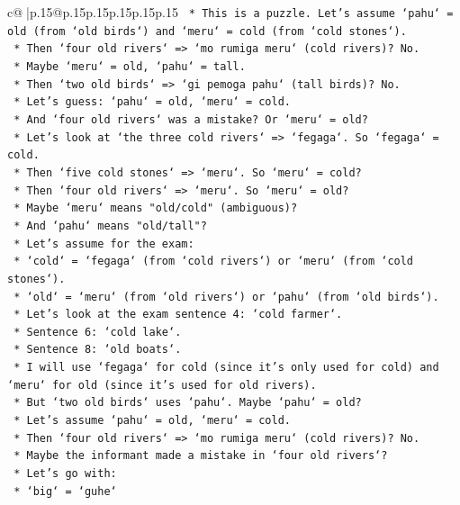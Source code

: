 \documentclass{article}
\begin{document}
{\begin{supertabular}{c@{$\;$}|p{.15\linewidth}@{}p{.15\linewidth}p{.15\linewidth}p{.15\linewidth}p{.15\linewidth}p{.15\linewidth}}
{{{\texttt{    *   This is a puzzle. Let's assume `pahu` = old (from `old birds`) and `meru` = cold (from `cold stones`).} \\
\texttt{    *   Then `four old rivers` => `mo rumiga meru` (cold rivers)? No.} \\
\texttt{    *   Maybe `meru` = old, `pahu` = tall.} \\
\texttt{    *   Then `two old birds` => `gi pemoga pahu` (tall birds)? No.} \\
\texttt{    *   Let's guess: `pahu` = old, `meru` = cold.} \\
\texttt{    *   And `four old rivers` was a mistake? Or `meru` = old?} \\
\texttt{    *   Let's look at `the three cold rivers` => `fegaga`. So `fegaga` = cold.} \\
\texttt{    *   Then `five cold stones` => `meru`. So `meru` = cold?} \\
\texttt{    *   Then `four old rivers` => `meru`. So `meru` = old?} \\
\texttt{    *   Maybe `meru` means "old/cold" (ambiguous)?} \\
\texttt{    *   And `pahu` means "old/tall"?} \\
\texttt{    *   Let's assume for the exam:} \\
\texttt{        *   `cold` = `fegaga` (from `cold rivers`) or `meru` (from `cold stones`).} \\
\texttt{        *   `old` = `meru` (from `old rivers`) or `pahu` (from `old birds`).} \\
\texttt{    *   Let's look at the exam sentence 4: `cold farmer`.} \\
\texttt{    *   Sentence 6: `cold lake`.} \\
\texttt{    *   Sentence 8: `old boats`.} \\
\texttt{    *   I will use `fegaga` for cold (since it's only used for cold) and `meru` for old (since it's used for old rivers).} \\
\texttt{    *   But `two old birds` uses `pahu`. Maybe `pahu` = old?} \\
\texttt{    *   Let's assume `pahu` = old, `meru` = cold.} \\
\texttt{    *   Then `four old rivers` => `mo rumiga meru` (cold rivers)? No.} \\
\texttt{    *   Maybe the informant made a mistake in `four old rivers`?} \\
\texttt{    *   Let's go with:} \\
\texttt{        *   `big` = `guhe`} \\
}}}
\end{supertabular}}
\end{document}
